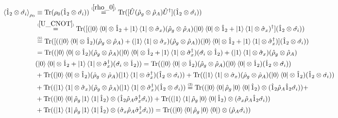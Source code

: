 \documentclass[11pt]{article}
\numberwithin{equation}{section} %
\numberwithin{figure}{section} %
\newcommand\numeq[1] %
  {\stackrel{\scriptscriptstyle(\mkern-1.5mu#1\mkern-1.5mu)}{=}}
\begin{document}
\begin{equation} \label{Kronecker_trace2}
\begin{split}
\braket{\hat{1}_2\otimes\hat{\sigma_i}}_{\rho_0}
&\equiv\textrm{Tr}(\rho_0(\hat{1}_2\otimes\hat{\sigma_i}))\numeq{\ref{rho_0}}\textrm{Tr}([\hat{U}(\hat{\rho}_g\otimes\hat{\rho}_A)\hat{U}^\dagger](\hat{1}_2\otimes\hat{\sigma_i}))\\
&\numeq{\ref{U_CNOT}}\textrm{Tr}([(\ket{0}\bra{0}\otimes\hat{1}_2+\ket{1}\bra{1}\otimes\hat{\sigma}_x)(\hat{\rho}_g\otimes\hat{\rho}_A)(\ket{0}\bra{0}\otimes\hat{1}_2+\ket{1}\bra{1}\otimes\hat{\sigma}_x)^\dagger](\hat{1}_2\otimes\hat{\sigma_i}))\\
&\numeq{1}\textrm{Tr}([((\ket{0}\bra{0}\otimes\hat{1}_2)(\hat{\rho}_g\otimes\hat{\rho}_A)+(\ket{1}\bra{1}\otimes\hat{\sigma}_x)(\hat{\rho}_g\otimes\hat{\rho}_A))(\ket{0}\bra{0}\otimes\hat{1}_2+\ket{1}\bra{1}\otimes\hat{\sigma}_x^\dagger)](\hat{1}_2\otimes\hat{\sigma_i}))\\
&=\textrm{Tr}((\ket{0}\bra{0}\otimes\hat{1}_2)(\hat{\rho}_g\otimes\hat{\rho}_A)(\ket{0}\bra{0}\otimes\hat{1}_2+\ket{1}\bra{1}\otimes\hat{\sigma}_x^\dagger)(\hat{\sigma_i}\otimes\hat{1}_2)+(\ket{1}\bra{1}\otimes\hat{\sigma}_x)(\hat{\rho}_g\otimes\hat{\rho}_A)\\
&(\ket{0}\bra{0}\otimes\hat{1}_2+\ket{1}\bra{1}\otimes\hat{\sigma}_x^\dagger)(\hat{\sigma_i}\otimes\hat{1}_2))=\textrm{Tr}((\ket{0}\bra{0}\otimes\hat{1}_2)(\hat{\rho}_g\otimes\hat{\rho}_A)(\ket{0}\bra{0}\otimes\hat{1}_2)(\hat{1}_2\otimes\hat{\sigma_i}))\\
&+\textrm{Tr}((\ket{0}\bra{0}\otimes\hat{1}_2)(\hat{\rho}_g\otimes\hat{\rho}_A)(\ket{1}\bra{1}\otimes\hat{\sigma}_x^\dagger)(\hat{1}_2\otimes\hat{\sigma_i}))+\textrm{Tr}((\ket{1}\bra{1}\otimes\hat{\sigma}_x)(\hat{\rho}_g\otimes\hat{\rho}_A)(\ket{0}\bra{0}\otimes\hat{1}_2)(\hat{1}_2\otimes\hat{\sigma_i}))\\
&+\textrm{Tr}((\ket{1}\bra{1}\otimes\hat{\sigma}_x)(\hat{\rho}_g\otimes\hat{\rho}_A)(\ket{1}\bra{1}\otimes\hat{\sigma}_x^\dagger)(\hat{1}_2\otimes\hat{\sigma_i}))\numeq{2}\textrm{Tr}((\ket{0}\bra{0}\hat{\rho}_g\ket{0}\bra{0}\hat{1}_2)\otimes(\hat{1}_2\hat{\rho}_A\hat{1}_2\hat{\sigma_i}))+\\
&+\textrm{Tr}((\ket{0}\bra{0}\hat{\rho}_g\ket{1}\bra{1}\hat{1}_2)\otimes(\hat{1}_2\hat{\rho}_A\hat{\sigma}_x^\dagger\hat{\sigma_i}))+\textrm{Tr}((\ket{1}\bra{1}\hat{\rho}_g\ket{0}\bra{0}\hat{1}_2)\otimes(\hat{\sigma}_x \hat{\rho}_A \hat{1}_2 \hat{\sigma_i}))\\
&+\textrm{Tr}((\ket{1}\bra{1}\hat{\rho}_g\ket{1}\bra{1}\hat{1}_2)\otimes(\hat{\sigma}_x \hat{\rho}_A \hat{\sigma}_x^\dagger \hat{\sigma_i}))=\textrm{Tr}((\ket{0}\bra{0}\hat{\rho}_g\ket{0}\bra{0})\otimes(\hat{\rho}_A\hat{\sigma_i}))\\

\end{split}
\end{equation}
\end{document}
